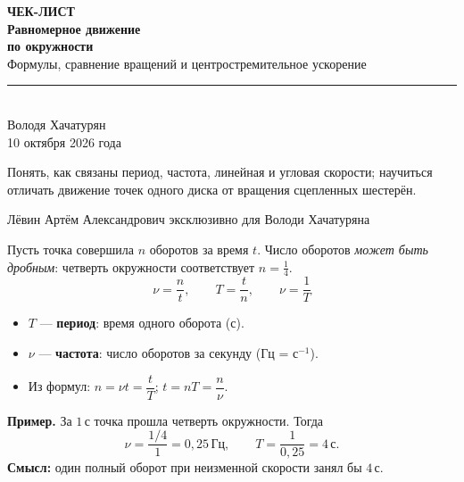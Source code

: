 \documentclass[a4paper,12pt]{article}
\newcommand{\topic}[1]{\vspace{0.3em}{\large\bfseries\color{darkaccent}#1}\par\vspace{0.1em}{\color{rulegray}\rule{\linewidth}{0.5pt}}\vspace{0.05em}}
\newcommand{\term}[1]{\textbf{\color{darkaccent}#1}}
\newcommand{\eqbox}[1]{\[\boxed{#1}\]}
\newcommand{\unit}[1]{\,\text{#1}}
\begin{document}
\thispagestyle{empty}
\begin{center}
\vspace*{25mm}
{\Large\bfseries\color{accent}ЧЕК-ЛИСТ}\\[10mm]
{\Huge\bfseries\color{darkaccent}Равномерное движение\\[2mm] по окружности}\\[10mm]
{\large Формулы, сравнение вращений и центростремительное ускорение}\\[15mm]
{\color{accent}\rule{0.64\linewidth}{0.8pt}}\\[15mm]
{\Large Володя Хачатурян}\\[4mm]
{\large 10 октября 2026 года}\\[19mm]
\begin{minipage}{0.84\linewidth}\centering
Понять, как связаны период, частота, линейная и угловая скорости; научиться отличать движение точек одного диска от вращения сцепленных шестерён.
\end{minipage}
\end{center}
\vfill
\begin{center}
{\small\color{darkaccent}Лёвин Артём Александрович эксклюзивно для Володи Хачатуряна}
\end{center}
\vspace{6mm}
\clearpage

\topic{1. Период и частота}
Пусть точка совершила $n$ оборотов за время $t$. Число оборотов \emph{может быть дробным}: четверть окружности соответствует $n=\frac14$.
\eqbox{\nu=\frac{n}{t},\qquad T=\frac{t}{n},\qquad \nu=\frac1T}
\begin{itemize}
 \item $T$ --- \term{период}: время одного оборота (с).
 \item $\nu$ --- \term{частота}: число оборотов за секунду (Гц = с$^{-1}$).
 \item Из формул: $n=\nu t=\dfrac{t}{T}$; $t=nT=\dfrac n\nu$.
\end{itemize}
\textbf{Пример.} За $1\unit{с}$ точка прошла четверть окружности. Тогда
\[\nu=\frac{1/4}{1}=0{,}25\unit{Гц},\qquad T=\frac1{0{,}25}=4\unit{с}.\]
\textbf{Смысл:} один полный оборот при неизменной скорости занял бы $4\unit{с}$.
\end{document}
